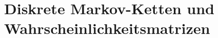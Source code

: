 %
%
%
\section{Diskrete Markov-Ketten und Wahrscheinlichkeitsmatrizen
\label{buch:section:diskrete-markov-ketten}}


